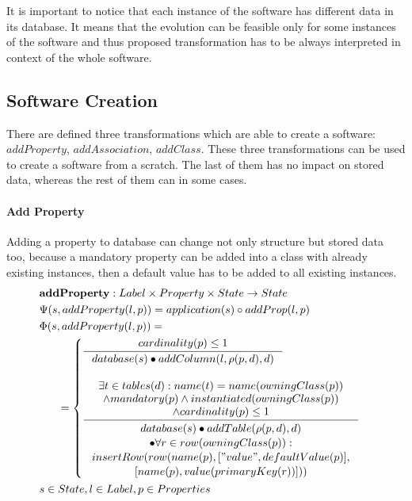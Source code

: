 \documentclass[11pt]{article}
\begin{document}
It is important to notice that each instance of the software has different data in its database. It means that the evolution can be feasible only for some instances of the software and thus proposed transformation has to be always interpreted in context of the whole software.


\subsection{Software Creation}
There are defined three transformations which are able to create a software: $addProperty$, $addAssociation$,  $addClass$. These three transformations can be used to create a software from a scratch. The last of them has no impact on stored data, whereas the rest of them can in some cases.
\paragraph{Add Property} Adding a property to database can change not only structure but stored data too, because a mandatory property can be added into a class with already existing instances, then a default value has to be added to all existing instances.
\begin{align*}
&	\mathbf{addProperty} : Label \times Property \times State \rightarrow State \\
&	\Psi(s, addProperty(l, p)) = application(s) \circ addProp(l,p) \\
&	\Phi(s, addProperty(l, p)) = \\
& \;\;\;\;\;\; = \begin{cases}
    		\inference{cardinality(p) \leq 1}{database(s) \bullet addColumn(l, \rho(p,d), d)} \\ \\
	    \inference{ \exists t \in tables(d) : name(t) = name(owningClass(p)) \\ \wedge mandatory(p) \wedge instantiated(owningClass(p)) \\ \wedge cardinality(p) \leq 1}{\begin{gathered}
   database(s) \bullet addTable(\rho(p,d), d) \\ \bullet \forall r \in row(owningClass(p)) :\\ insertRow(row(name(p), ["value", defaultValue(p)], \\ [name(p), value(primaryKey(r))])) 
    \end{gathered} } 
   \end{cases}\\
&	s \in State, l \in Label, p \in Properties
\end{align*}
\end{document}
